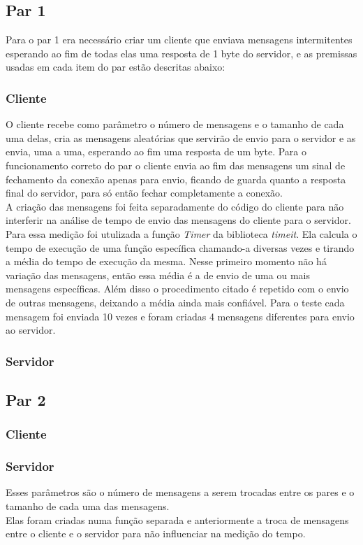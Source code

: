 \documentclass[12pt]{article}
\begin{document}
\subsection{Par 1}
Para o par 1 era necessário criar um cliente que enviava mensagens intermitentes esperando ao fim de todas elas
uma resposta de 1 byte do servidor, e as premissas usadas em cada item do par estão descritas abaixo:

\subsubsection{Cliente}
O cliente recebe como parâmetro o número de mensagens e o tamanho de cada uma delas,
cria as mensagens aleatórias que servirão de envio para o servidor e as envia, uma a uma, 
esperando ao fim uma resposta de um byte. Para o funcionamento correto do par o cliente envia
ao fim das mensagens um sinal de fechamento da conexão apenas para envio, 
ficando de guarda quanto a resposta final do servidor, para só então fechar completamente a conexão.\\

A criação das mensagens foi feita separadamente do código do cliente para não interferir na análise de tempo
de envio das mensagens do cliente para o servidor. Para essa medição foi utulizada a função \textit{Timer} da biblioteca \textit{timeit}.
Ela calcula o tempo de execução de uma função específica chamando-a diversas vezes e tirando a média do tempo de execução da mesma. 
Nesse primeiro momento não há variação das mensagens, então essa média é a de envio de uma ou mais mensagens específicas. 
Além disso o procedimento citado é repetido  com o envio de outras mensagens, deixando a média ainda mais confiável. 
Para o teste cada mensagem foi enviada 10 vezes e foram criadas 4 mensagens diferentes para envio ao servidor.

\subsubsection{Servidor}

\subsection{Par 2}
\subsubsection{Cliente}
\subsubsection{Servidor}
Esses parâmetros são o número de mensagens a serem trocadas entre os pares e o tamanho de cada uma das mensagens.\\
Elas foram criadas numa função separada e anteriormente a troca de mensagens entre o cliente e o servidor para não
influenciar na medição do tempo.\\
\end{document}
